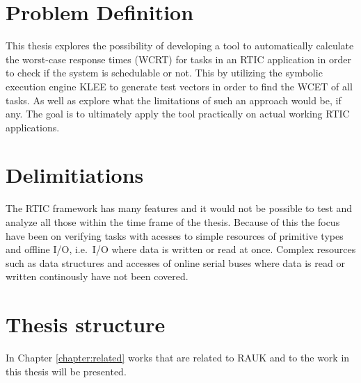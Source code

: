 
\section{Problem Definition}
This thesis explores the possibility of developing a tool to automatically
calculate the worst-case response times (WCRT)  for tasks in an RTIC
application in order to check if the system is schedulable or not. This by
utilizing the symbolic execution engine KLEE to generate test vectors in
order to find the WCET of all tasks. As well as explore what the limitations of
such an approach would be, if any. The goal is to ultimately apply the tool
practically on actual working RTIC applications.

\section{Delimitiations} 
The RTIC framework has many features and it would not be possible to test and
analyze all those within the time frame of the thesis.  Because of this the
focus have been on verifying tasks with acesses to simple resources of
primitive types and offline I/O, i.e.\ I/O where data is written or read at
once. Complex resources such as data structures and accesses of online serial
buses where data is read or written continously have not been covered.

\section{Thesis structure}
In Chapter \ref{chapter:related} works that are related to RAUK and to the work in
this thesis will be presented.
